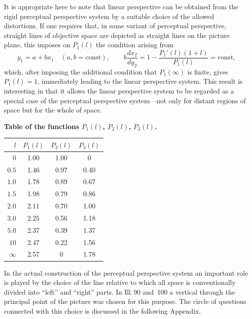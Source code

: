 It is appropriate here to note that linear perspective can be obtained from the rigid
perceptual perspective system by a suitable choice of the allowed distortions.  If one
requires that, in some variant of perceptual perspective, straight lines of objective
space are depicted as straight lines on the picture plane, this imposes on $P_1(l)$ the
condition arising from
\[
  y_1 = a + bx_1 \quad(a,b = \mathrm{const}),\qquad
  b\frac{dx_2}{dy_2} = 1 - \frac{P_1'(l)(1+l)}{P_1(l)} = \mathrm{const},
\]
which, after imposing the additional condition that $P_1(\infty)$ is finite,
gives $P_1(l) = 1$, immediately leading to the linear perspective system.  This result
is interesting in that it allows the linear perspective system to be regarded as a special
case of the perceptual perspective system---not only for distant regions of space but
for the whole of space.

\bigskip
\noindent\textbf{Table of the functions $P_1(l)$, $P_2(l)$, $P_3(l)$.}

\medskip
\begin{center}
\begin{tabular}{r|ccc}
  $l$ & $P_1(l)$ & $P_2(l)$ & $P_3(l)$ \\
  \hline
  $0$     & 1.00 & 1.00 & 0     \\
  $0.5$   & 1.46 & 0.97 & 0.40  \\
  $1.0$   & 1.78 & 0.89 & 0.67  \\
  $1.5$   & 1.98 & 0.79 & 0.86  \\
  $2.0$   & 2.11 & 0.70 & 1.00  \\
  $3.0$   & 2.25 & 0.56 & 1.18  \\
  $5.0$   & 2.37 & 0.39 & 1.37  \\
  $10$    & 2.47 & 0.22 & 1.56  \\
  $\infty$& 2.57 & 0    & 1.78  \\
\end{tabular}
\end{center}

\medskip\noindent
[Here $P_1(l) = 1 + \arctan l$;\; $P_2(l) = P_1(l)/(1+l)$;\;
$P_3(l) = \int_0^l P_1(t)/(1+t)^2\,dt$, evaluated using formula~(3.2).]

In the actual construction of the perceptual perspective system an important role is
played by the choice of the line relative to which all space is conventionally divided into
``left'' and ``right'' parts.  In Ill.\,90 and~100 a vertical through the principal point
of the picture was chosen for this purpose.  The circle of questions connected with this
choice is discussed in the following Appendix.
